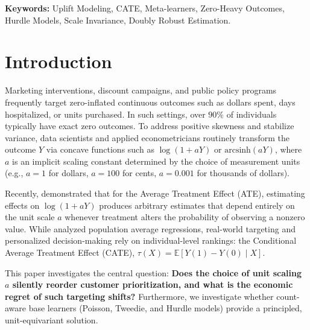 \documentclass[conference]{IEEEtran}
\newcommand{\E}{\mathbb{E}}
\begin{document}
\vspace{1em}
\noindent \textbf{Keywords:} Uplift Modeling, CATE, Meta-learners, Zero-Heavy Outcomes, Hurdle Models, Scale Invariance, Doubly Robust Estimation.

\newpage

\section{Introduction}
\label{sec:intro}

Marketing interventions, discount campaigns, and public policy programs frequently target zero-inflated continuous outcomes such as dollars spent, days hospitalized, or units purchased. In such settings, over $90\%$ of individuals typically have exact zero outcomes. To address positive skewness and stabilize variance, data scientists and applied econometricians routinely transform the outcome $Y$ via concave functions such as $\log(1 + aY)$ or $\text{arcsinh}(aY)$, where $a$ is an implicit scaling constant determined by the choice of measurement units (e.g., $a=1$ for dollars, $a=100$ for cents, $a=0.001$ for thousands of dollars).

Recently, \cite{chen2024logs} demonstrated that for the Average Treatment Effect (ATE), estimating effects on $\log(1 + aY)$ produces arbitrary estimates that depend entirely on the unit scale $a$ whenever treatment alters the probability of observing a nonzero value. While \cite{chen2024logs} analyzed population average regressions, real-world targeting and personalized decision-making rely on individual-level rankings: the Conditional Average Treatment Effect (CATE), $\tau(X) = \E[Y(1) - Y(0) \mid X]$.

This paper investigates the central question: \textbf{Does the choice of unit scaling $a$ silently reorder customer prioritization, and what is the economic regret of such targeting shifts?} Furthermore, we investigate whether count-aware base learners (Poisson, Tweedie, and Hurdle models) provide a principled, unit-equivariant solution.
\end{document}
